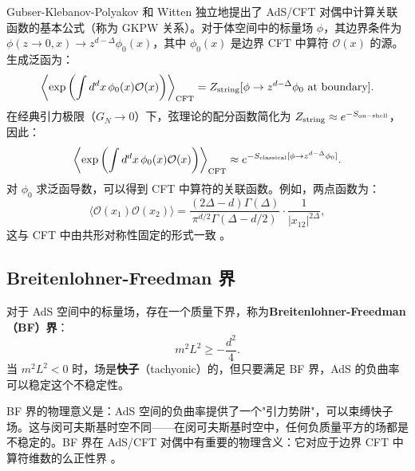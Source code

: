 \begin{remark}
Gubser-Klebanov-Polyakov \cite{Gubser1998} 和 Witten \cite{Witten1998} 独立地提出了 AdS/CFT 对偶中计算关联函数的基本公式（称为 GKPW 关系）。对于体空间中的标量场 $\phi$，其边界条件为 $\phi(z \to 0, x) \to z^{d-\Delta} \phi_0(x)$，其中 $\phi_0(x)$ 是边界 CFT 中算符 $\mathcal{O}(x)$ 的源。生成泛函为：
\begin{equation}
    \left\langle \exp\left(\int d^d x \, \phi_0(x) \mathcal{O}(x)\right) \right\rangle_{\rm CFT} = Z_{\rm string}[\phi \to z^{d-\Delta} \phi_0 \text{ at boundary}].
\end{equation}
在经典引力极限（$G_N \to 0$）下，弦理论的配分函数简化为 $Z_{\rm string} \approx e^{-S_{\rm on-shell}}$，因此：
\begin{equation}
    \left\langle \exp\left(\int d^d x \, \phi_0(x) \mathcal{O}(x)\right) \right\rangle_{\rm CFT} \approx e^{-S_{\rm classical}[\phi \to z^{d-\Delta} \phi_0]}.
\end{equation}
对 $\phi_0$ 求泛函导数，可以得到 CFT 中算符的关联函数。例如，两点函数为：
\begin{equation}
    \langle \mathcal{O}(x_1) \mathcal{O}(x_2) \rangle = \frac{(2\Delta - d) \Gamma(\Delta)}{\pi^{d/2} \Gamma(\Delta - d/2)} \cdot \frac{1}{|x_{12}|^{2\Delta}},
\end{equation}
这与 CFT 中由共形对称性固定的形式一致 \cite{Witten1998}。
\end{remark}

\subsection{Breitenlohner-Freedman 界}

对于 AdS 空间中的标量场，存在一个质量下界，称为\textbf{Breitenlohner-Freedman（BF）界}：
\begin{equation}
    m^2 L^2 \geq -\frac{d^2}{4}.
\end{equation}
当 $m^2 L^2 < 0$ 时，场是\textbf{快子}（tachyonic）的，但只要满足 BF 界，AdS 的负曲率可以稳定这个不稳定性。

\begin{remark}
BF 界的物理意义是：AdS 空间的负曲率提供了一个"引力势阱"，可以束缚快子场。这与闵可夫斯基时空不同——在闵可夫斯基时空中，任何负质量平方的场都是不稳定的。BF 界在 AdS/CFT 对偶中有重要的物理含义：它对应于边界 CFT 中算符维数的么正性界 \cite{Aharony1999}。
\end{remark}

